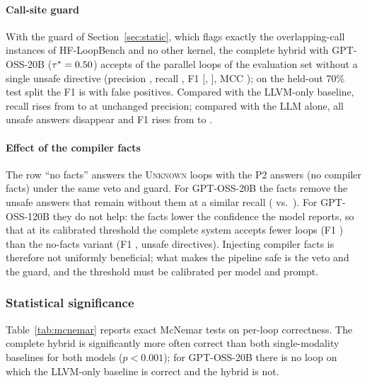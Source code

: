\paragraph{Call-site guard} With the guard of Section~\ref{sec:static}, which flags exactly the \nCtxFlaggedAll{} overlapping-call instances of HF-LoopBench and no other kernel, the complete hybrid with GPT-OSS-20B ($\tau^*=0.50$) accepts \evHCTwentyTP{} of the \nEvalPar{} parallel loops of the evaluation set without a single unsafe directive (precision \evHCTwentyPrec{}, recall \evHCTwentyRec{}, F1 \evHCTwentyFone{} [\evHCTwentyFoneLo{}, \evHCTwentyFoneHi{}], MCC \evHCTwentyMCC{}); on the held-out 70\% test split the F1 is \evHCTwentyTestFone{} with \evHCTwentyTestFP{} false positives. Compared with the LLVM-only baseline, recall rises from \evStaticRec{} to \evHCTwentyRec{} at unchanged precision; compared with the LLM alone, all \evAITwentyFP{} unsafe answers disappear and F1 rises from \evAITwentyFone{} to \evHCTwentyFone{}.

\paragraph{Effect of the compiler facts} The row ``no facts'' answers the \textsc{Unknown} loops with the P2 answers (no compiler facts) under the same veto and guard. For GPT-OSS-20B the facts remove the \evHBTwentyFP{} unsafe answers that remain without them at a similar recall (\evHCTwentyRec{} vs.\ \evHBTwentyRec{}). For GPT-OSS-120B they do not help: the facts lower the confidence the model reports, so that at its calibrated threshold the complete system accepts fewer loops (F1 \evHCOneTwentyFone{}) than the no-facts variant (F1 \evHBOneTwentyFone{}, \evHBOneTwentyFP{} unsafe directives). Injecting compiler facts is therefore not uniformly beneficial; what makes the pipeline safe is the veto and the guard, and the threshold must be calibrated per model and prompt.

\subsubsection{Statistical significance}
Table~\ref{tab:mcnemar} reports exact McNemar tests on per-loop correctness. The complete hybrid is significantly more often correct than both single-modality baselines for both models ($p<0.001$); for GPT-OSS-20B there is no loop on which the LLVM-only baseline is correct and the hybrid is not.



